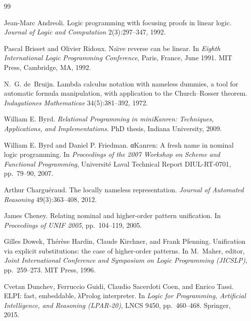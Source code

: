 \begin{thebibliography}{99}

Jean-Marc Andreoli.
\newblock Logic programming with focusing proofs in linear logic.
\newblock \emph{Journal of Logic and Computation} 2(3):297--347, 1992.

Pascal Brisset and Olivier Ridoux.
\newblock Na\"{\i}ve reverse can be linear.
\newblock In \emph{Eighth International Logic Programming Conference}, Paris, France, June 1991. MIT Press,
  Cambridge, MA, 1992.

N.~G. de~Bruijn.
\newblock Lambda calculus notation with nameless dummies, a tool for automatic formula manipulation, with
  application to the Church--Rosser theorem.
\newblock \emph{Indagationes Mathematicae} 34(5):381--392, 1972.

William E. Byrd.
\newblock \emph{Relational Programming in miniKanren: Techniques, Applications, and Implementations}.
\newblock PhD thesis, Indiana University, 2009.

William E. Byrd and Daniel P. Friedman.
\newblock αKanren: A fresh name in nominal logic programming.
\newblock In \emph{Proceedings of the 2007 Workshop on Scheme and Functional Programming}, Université Laval
  Technical Report DIUL-RT-0701, pp.~79--90, 2007.

Arthur Charguéraud.
\newblock The locally nameless representation.
\newblock \emph{Journal of Automated Reasoning} 49(3):363--408, 2012.

James Cheney.
\newblock Relating nominal and higher-order pattern unification.
\newblock In \emph{Proceedings of UNIF 2005}, pp.~104--119, 2005.

Gilles Dowek, Thérèse Hardin, Claude Kirchner, and Frank Pfenning.
\newblock Unification via explicit substitutions: the case of higher-order patterns.
\newblock In M.~Maher, editor, \emph{Joint International Conference and Symposium on Logic Programming
  (JICSLP)}, pp.~259--273. MIT Press, 1996.

Cvetan Dunchev, Ferruccio Guidi, Claudio Sacerdoti Coen, and Enrico Tassi.
\newblock ELPI: fast, embeddable, λProlog interpreter.
\newblock In \emph{Logic for Programming, Artificial Intelligence, and Reasoning (LPAR-20)}, LNCS 9450, pp.~460--468.
  Springer, 2015.


\end{thebibliography}
